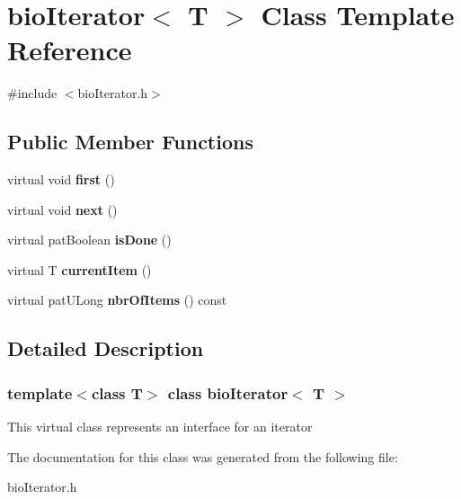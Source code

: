\hypertarget{classbio_iterator}{}\section{bio\+Iterator$<$ T $>$ Class Template Reference}
\label{classbio_iterator}


{\ttfamily \#include $<$bio\+Iterator.\+h$>$}

\subsection*{Public Member Functions}
\begin{DoxyCompactItemize}
\item 
\mbox{\label{classbio_iterator_a2ece611cef0a26e36690a20b62403447}} 
virtual void {\bfseries first} ()
\item 
\mbox{\label{classbio_iterator_ad1f069ad2b368cb107010660041dd857}} 
virtual void {\bfseries next} ()
\item 
\mbox{\label{classbio_iterator_a7eda9c753dd9955f76adea20756e1df2}} 
virtual pat\+Boolean {\bfseries is\+Done} ()
\item 
\mbox{\label{classbio_iterator_a0c953cd025b9c7430da703f403c70cef}} 
virtual T {\bfseries current\+Item} ()
\item 
\mbox{\label{classbio_iterator_aadd404987d4fa44ac1dca4097627578f}} 
virtual pat\+U\+Long {\bfseries nbr\+Of\+Items} () const
\end{DoxyCompactItemize}


\subsection{Detailed Description}
\subsubsection*{template$<$class T$>$\newline
class bio\+Iterator$<$ T $>$}

This virtual class represents an interface for an iterator 

The documentation for this class was generated from the following file\+:\begin{DoxyCompactItemize}
\item 
bio\+Iterator.\+h\end{DoxyCompactItemize}
